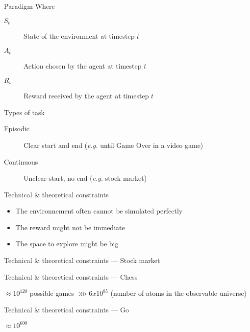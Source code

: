 \begin{frame}{Paradigm}
  Where

  \begin{description}
    \item[$S_t$] State of the environment at timestep $t$
    \item[$A_t$] Action chosen by the agent at timestep $t$
    \item[$R_t$] Reward received by the agent at timestep $t$
  \end{description}
\end{frame}

\begin{frame}{Types of task}
  \begin{description}
    \item[Episodic] Clear start and end (\textit{e.g.} until Game Over in a video game)
    \item[Continuous] Unclear start, no end (\textit{e.g.} stock market)
  \end{description}
\end{frame}

\begin{frame}{Technical \& theoretical constraints}
  \begin{itemize}
    \item The environnement often cannot be simulated perfectly 
    \item The reward might not be immediate
    \item The space to explore might be big
  \end{itemize}
\end{frame}

\begin{frame}{Technical \& theoretical constraints --- Stock market}
\end{frame}

\begin{frame}{Technical \& theoretical constraints --- Chess}
  \pause
  \begin{center}
    $\approx 10^{120}$ possible games $\ggg 6 x 10^{85}$
    \newline
    (number of atoms in the observable universe)
  \end{center}
\end{frame}

\begin{frame}{Technical \& theoretical constraints --- Go}
  \begin{center}
    \huge{$\approx 10^{600}$}
  \end{center}
\end{frame}
